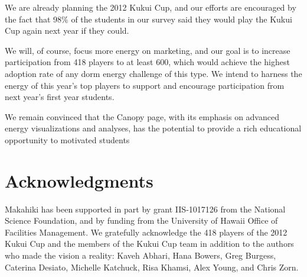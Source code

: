\documentclass{acm_proc_article-sp}
\begin{document}
We are already planning the 2012 Kukui Cup, and our efforts are encouraged
by the fact that 98\% of the students in our survey said they would play
the Kukui Cup again next year if they could. 

We will, of course, focus more energy on marketing, and our goal is to
increase participation from 418 players to at least 600, which would
achieve the highest adoption rate of any dorm energy challenge of this
type.  We intend to harness the energy of this year's top players to
support and encourage participation from next year's first year students.

We remain convinced that the Canopy page, with its emphasis on advanced
energy visualizations and analyses, has the potential to provide a rich educational
opportunity to motivated students 



\section{Acknowledgments}

Makahiki has been supported in part by grant IIS-1017126 from the National
Science Foundation, and by funding from the University of Hawaii Office of Facilities
Management.   We gratefully acknowledge the 418 players of the 2012 Kukui
Cup and the members of the Kukui Cup team in addition to the authors who made the vision a
reality:  Kaveh Abhari, Hana Bowers, Greg Burgess, Caterina Desiato,
Michelle Katchuck, Risa Khamsi, Alex Young, and Chris Zorn. 


  

\balancecolumns
\end{document}
